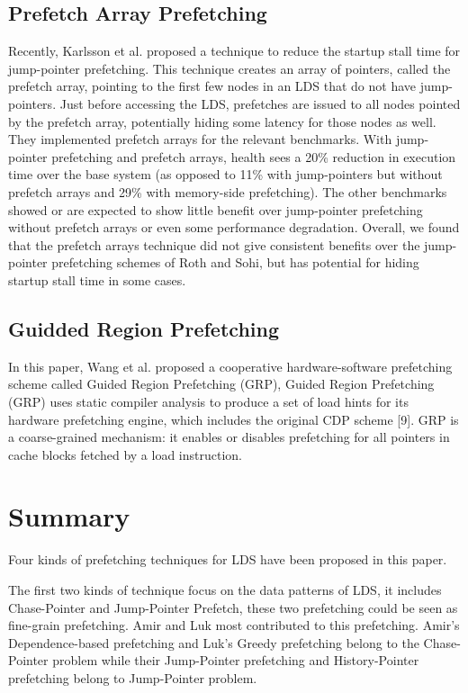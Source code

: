 \documentclass{acm_proc_article-sp}
\begin{document}
\subsection{Prefetch Array Prefetching\cite{824351}} 
Recently, Karlsson et al. proposed a technique to reduce the startup
stall time for jump-pointer prefetching. This technique creates an
array of pointers, called the prefetch array, pointing to the first few nodes 
in an LDS that do not have jump-pointers. Just before accessing the
LDS, prefetches are issued to all nodes 
pointed by the prefetch array, potentially hiding some latency for
those nodes as well.
 They implemented prefetch arrays for the relevant benchmarks. With jump-pointer
prefetching and prefetch arrays, health sees 
a 20\% reduction in execution time over the base system (as opposed to
11\% with jump-pointers but without 
prefetch arrays and 29\% with memory-side prefetching). The other
benchmarks showed or are expected to 
show little benefit over jump-pointer prefetching without prefetch
arrays or even some performance degradation. Overall, we found that the prefetch
arrays technique did not give consistent 
benefits over the jump-pointer prefetching schemes of Roth and Sohi,
but has potential for hiding startup 
stall time in some cases.

\subsection{Guidded Region
  Prefetching\cite{Wang:2003:GRP:871656.859663}} 

In this paper, Wang et al. proposed a cooperative hardware-software
 prefetching scheme called Guided Region Prefetching (GRP), Guided
 Region Prefetching (GRP) uses static compiler analysis to produce a
 set of load hints for its 
hardware prefetching engine, which includes the original CDP scheme
[9]. GRP is a coarse-grained mechanism: it enables or disables
prefetching for all pointers 
in cache blocks fetched by a load instruction. 

\section{Summary}

Four kinds of prefetching techniques for LDS have been
proposed in this paper. 

The first two kinds of technique focus on the data patterns of LDS,
it includes Chase-Pointer and Jump-Pointer Prefetch, these two
prefetching could be seen as fine-grain prefetching.
Amir and Luk most contributed to this prefetching.
Amir's Dependence-based prefetching and Luk's Greedy prefetching
belong to the Chase-Pointer problem while their Jump-Pointer
prefetching and History-Pointer prefetching belong to Jump-Pointer
problem. \cite{Roth:1999:EJP:307338.300989}\cite{Roth:1998:DBP:384265.291034}\cite{Luk:1996:CPR:248208.237190}  
\end{document}
